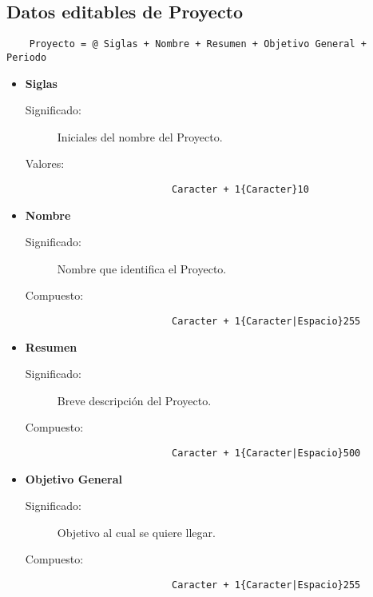 
\subsection{Datos editables de Proyecto}
\label{dd:DatosEditablesProyecto}

\begin{lstlisting}
	Proyecto = @ Siglas + Nombre + Resumen + Objetivo General + Periodo
\end{lstlisting}
\begin{itemize}

	\item	\textbf{Siglas}
		\begin{description}
			\item[Significado:]Iniciales del nombre del Proyecto.
			\item[Valores:]{\begin{lstlisting}
					Caracter + 1{Caracter}10\end{lstlisting}}
		\end{description}

	\item	\textbf{Nombre}
		\begin{description}
			\item[Significado:]Nombre que identifica el Proyecto.
			\item[Compuesto:]{\begin{lstlisting}
					Caracter + 1{Caracter|Espacio}255\end{lstlisting}}
		\end{description}

	\item	\textbf{Resumen}
		\begin{description}
			\item[Significado:]Breve descripción del Proyecto.
			\item[Compuesto:]{\begin{lstlisting}
					Caracter + 1{Caracter|Espacio}500\end{lstlisting}}
		\end{description}

	\item	\textbf{Objetivo General}
		\begin{description}
			\item[Significado:]Objetivo al cual se quiere llegar.
			\item[Compuesto:]{\begin{lstlisting}
					Caracter + 1{Caracter|Espacio}255\end{lstlisting}}
		\end{description}


\end{itemize}
